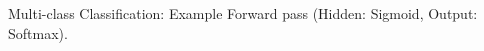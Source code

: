 \begin{frame} {Multi-class Classification: Example}
  \small{Forward pass (Hidden: Sigmoid, Output: Softmax).}
  \begin{figure}
    \centering

\end{figure}
\end{frame}
